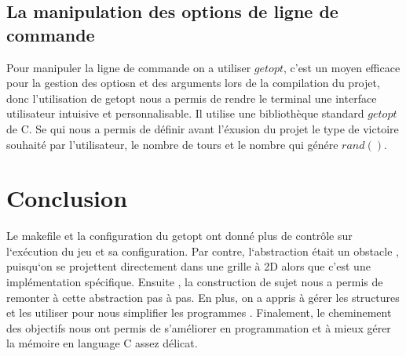\documentclass[a4paper]{article}
\begin{document}
\subsection{La manipulation des options de ligne de commande}


Pour manipuler la ligne de commande on a utiliser $getopt$, c'est un moyen efficace pour la gestion des optiosn
 et des arguments lors de la compilation du projet, donc l'utilisation de getopt nous a permis de rendre le terminal
  une interface utilisateur intuisive et personnalisable. Il utilise une bibliothèque standard $getopt$ de C. Se qui 
  nous a permis de définir avant l'éxusion du projet le type de victoire souhaité par l'utilisateur, le nombre de tours 
  et le nombre qui génére $rand()$. 



\section{Conclusion}
Le makefile et la configuration du getopt ont donné plus de contrôle sur l`exécution du jeu et sa configuration. Par contre, l`abstraction était un obstacle ,
puisqu`on se projettent directement dans une grille à 2D alors que c'est une implémentation spécifique. Ensuite , la construction de sujet 
nous a permis de remonter à cette abstraction pas à pas. En plus, on a appris à gérer les structures et les utiliser pour nous simplifier les programmes . Finalement, le cheminement 
des objectifs nous ont permis de s'améliorer en programmation et à mieux gérer la mémoire en language C assez délicat.  
\end{document}
